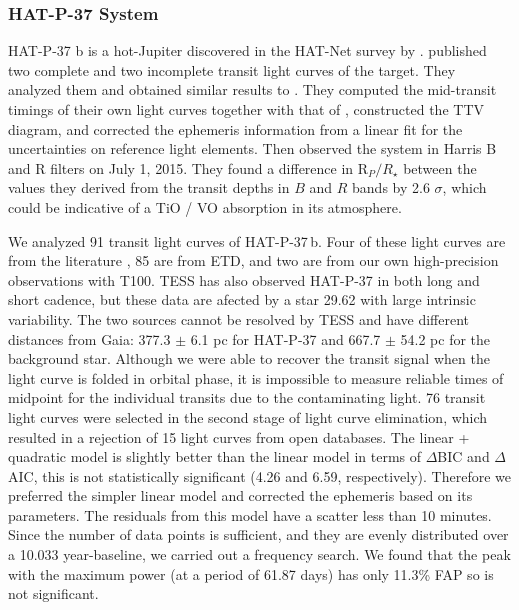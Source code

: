 \documentclass[a4paper,fleqn,usenatbib]{mnras}
\begin{document}
\subsubsection{HAT-P-37 System}
HAT-P-37 b is a hot-Jupiter discovered in the HAT-Net survey by \citet{2012AJ....144...19B}. \citet{2016AcA....66...55M} published two complete and two incomplete transit light curves of the target. They analyzed them and obtained similar results to \citet{2012AJ....144...19B}. They computed the mid-transit timings of their own light curves together with that of \citet{2012AJ....144...19B}, constructed the TTV diagram, and corrected the ephemeris information from a linear fit for the uncertainties on reference light elements. Then \citet{2017MNRAS.472.3871T} observed the system in Harris B and R filters on July 1, 2015. They found a difference in R${_P} / R_{\star}$ between the values they derived from the transit depths in $B$ and $R$ bands by 2.6 $\sigma$, which could be indicative of a TiO / VO absorption in its atmosphere. 

We analyzed 91 transit light curves of HAT-P-37\,b. Four of these light curves are from the literature \citep{2011ApJ...742..116B, 2018AcA....68..371M}, 85 are from ETD, and two are from our own high-precision observations with T100. TESS has also observed HAT-P-37 in both long and short cadence, but these data are afected by a star 29\arcsec.62 with large intrinsic variability. The two sources cannot be resolved by TESS and have different distances from Gaia: 377.3 $\pm$ 6.1 pc for HAT-P-37 and 667.7 $\pm$ 54.2 pc for the background star. Although we were able to recover the transit signal when the light curve is folded in orbital phase, it is impossible to measure reliable times of midpoint for the individual transits due to the contaminating light. 76 transit light curves were selected in the second stage of light curve elimination, which resulted in a rejection of 15 light curves from open databases. The linear + quadratic model is slightly better than the linear model in terms of $\Delta$BIC and $\Delta$AIC, this is not statistically significant (4.26 and 6.59, respectively). Therefore we preferred the simpler linear model and corrected the ephemeris based on its parameters. The residuals from this model have a scatter less than 10 minutes. Since the number of data points is sufficient, and they are evenly distributed over a 10.033 year-baseline, we carried out a frequency search. We found that the peak with the maximum power (at a period of 61.87 days) has only 11.3\% FAP so is not significant.
\end{document}
